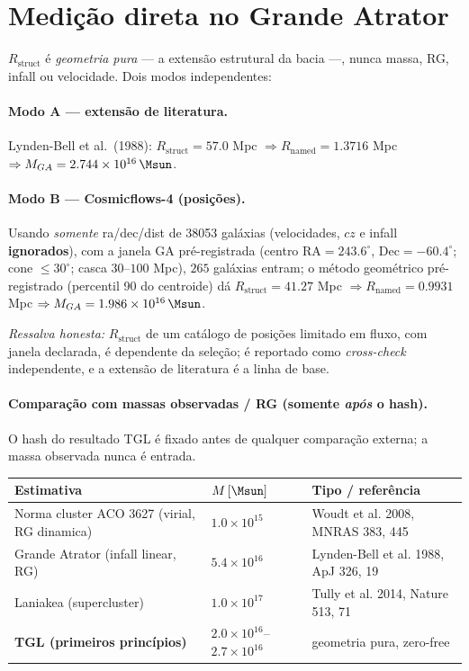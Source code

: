 \documentclass[11pt]{article}
\theoremstyle{definition}\newtheorem{deriv}{Derivação}
\begin{document}
\section{Medição direta no Grande Atrator}

$R_{\mathrm{struct}}$ é \emph{geometria pura} --- a extensão estrutural da bacia ---, nunca massa, RG, infall ou velocidade. Dois modos independentes:

\paragraph{Modo A --- extensão de literatura.} Lynden-Bell et al.\ (1988): $R_{\mathrm{struct}}=57.0$ Mpc $\Rightarrow R_{\mathrm{named}}=1.3716$ Mpc $\Rightarrow M_{GA}=2.744\times10^{16}\,\Msun$.

\paragraph{Modo B --- Cosmicflows-4 (posições).} Usando \emph{somente} ra/dec/dist de 38053 galáxias (velocidades, $cz$ e infall \textbf{ignorados}), com a janela GA pré-registrada (centro $\mathrm{RA}=243.6^\circ$, $\mathrm{Dec}=-60.4^\circ$; cone $\leq30^\circ$; casca $30$--$100$ Mpc), $265$ galáxias entram; o método geométrico pré-registrado (percentil 90 do centroide) dá $R_{\mathrm{struct}}=41.27$ Mpc $\Rightarrow R_{\mathrm{named}}=0.9931$ Mpc $\Rightarrow M_{GA}=1.986\times10^{16}\,\Msun$.

\emph{Ressalva honesta:} $R_{\mathrm{struct}}$ de um catálogo de posições limitado em fluxo, com janela declarada, é dependente da seleção; é reportado como \emph{cross-check} independente, e a extensão de literatura é a linha de base.

\paragraph{Comparação com massas observadas / RG (somente \emph{após} o hash).} O hash do resultado TGL é fixado antes de qualquer comparação externa; a massa observada nunca é entrada.

\begin{center}\small\begin{tabular}{p{5.3cm}l p{5.2cm}}\toprule

Estimativa & $M\,[\Msun]$ & Tipo / referência\\\midrule

Norma cluster ACO 3627 (virial, RG dinamica) & $1.0\times10^{15}$ & Woudt et al. 2008, MNRAS 383, 445\\

Grande Atrator (infall linear, RG) & $5.4\times10^{16}$ & Lynden-Bell et al. 1988, ApJ 326, 19\\

Laniakea (supercluster) & $1.0\times10^{17}$ & Tully et al. 2014, Nature 513, 71\\

\textbf{TGL (primeiros princípios)} & $2.0\times10^{16}$--$2.7\times10^{16}$ & geometria pura, zero-free\\\bottomrule

\end{tabular}\end{center}
\end{document}
